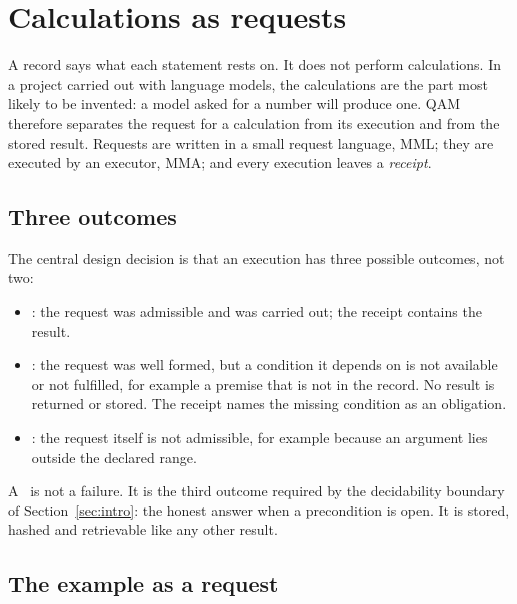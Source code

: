 \section{Calculations as requests}\label{sec:requests}

A record says what each statement rests on. It does not perform calculations. In a project carried out with language models, the
calculations are the part most likely to be invented: a model asked for a number will produce one. QAM therefore separates the request
for a calculation from its execution and from the stored result. Requests are written in a small request language, MML; they are
executed by an executor, MMA; and every execution leaves a \emph{receipt}.

\subsection{Three outcomes}

The central design decision is that an execution has three possible outcomes, not two:
\begin{itemize}[leftmargin=1.5em]
\item \cont: the request was admissible and was carried out; the receipt contains the result.
\item \guard: the request was well formed, but a condition it depends on is not available or not fulfilled, for example a premise that is not in the
record. No result is returned or stored. The receipt names the missing condition as an obligation.
\item \reject: the request itself is not admissible, for example because an argument lies outside the declared range.
\end{itemize}
A \guard\ is not a failure. It is the third outcome required by the decidability boundary of Section~\ref{sec:intro}: the honest answer
when a precondition is open. It is stored, hashed and retrievable like any other result.

\subsection{The example as a request}

